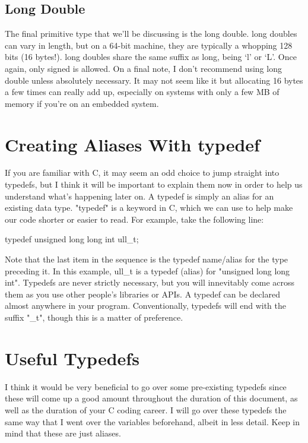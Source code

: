 \documentclass{article}
\begin{document}
\subsection{Long Double}

The final primitive type that we’ll be discussing is the long double. long doubles can vary in length, but on
a 64-bit machine, they are typically a whopping 128 bits (16 bytes!). long doubles share the same suffix as
long, being ‘l’ or ‘L’. Once again, only signed is allowed. On a final note, I don’t recommend using long
double unless absolutely necessary. It may not seem like it but allocating 16 bytes a few times can really add
up, especially on systems with only a few MB of memory if you’re on an embedded system.

\section{Creating Aliases With typedef}

If you are familiar with C, it may seem an odd choice to jump straight into typedefs, but I think it will be
important to explain them now in order to help us understand what’s happening later on. A typedef is simply an
alias for an existing data type. "typedef" is a keyword in C, which we can use to help make our code shorter or
easier to read. For example, take the following line:

\begin{cblk}
typedef unsigned long long int ull_t;
\end{cblk}

Note that the last item in the sequence is the typedef name/alias for the type preceding it. In this example,
ull\_t is a typedef (alias) for "unsigned long long int". Typedefs are never strictly necessary, but you will
innevitably come across them as you use other people's libraries or APIs. A typedef can be declared almost
anywhere in your program. Conventionally, typedefs will end with the suffix "\_t", though this is a matter of
preference.

\section{Useful Typedefs}

I think it would be very beneficial to go over some pre-existing typedefs since these will come up a good
amount throughout the duration of this document, as well as the duration of your C coding career. I will go
over these typedefs the same way that I went over the variables beforehand, albeit in less detail. Keep in
mind that these are just aliases.
\end{document}
